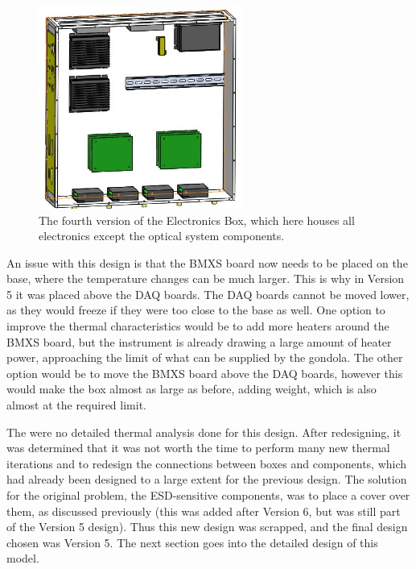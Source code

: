 \begin{figure}
    \centering
    \includegraphics[width=0.6\textwidth]{chap3_images/LIFE_V6_images/EBOX_V4.JPG}
    \caption{The fourth version of the Electronics Box, which here houses all electronics except the optical system components.}
    \label{fig:EBOX_V4}
\end{figure}

An issue with this design is that the BMXS board now needs to be placed on the base, where the temperature changes can be much larger. This is why in Version 5 it was placed above the DAQ boards. The DAQ boards cannot be moved lower, as they would freeze if they were too close to the base as well. One option to improve the thermal characteristics would be to add more heaters around the BMXS board, but the instrument is already drawing a large amount of heater power, approaching the limit of what can be supplied by the gondola. The other option would be to move the BMXS board above the DAQ boards, however this would make the box almost as large as before, adding weight, which is also almost at the required limit.

The were no detailed thermal analysis done for this design. After redesigning, it was determined that it was not worth the time to perform many new thermal iterations and to redesign the connections between boxes and components, which had already been designed to a large extent for the previous design. The solution for the original problem, the ESD-sensitive components, was to place a cover over them, as discussed previously (this was added after Version 6, but was still part of the Version 5 design). Thus this new design was scrapped, and the final design chosen was Version 5. The next section goes into the detailed design of this model.

